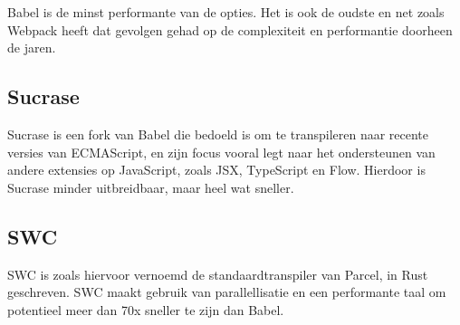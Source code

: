 Babel is de minst performante van de opties. Het is ook de oudste en net zoals Webpack heeft dat gevolgen gehad op de complexiteit en performantie doorheen de jaren. 

\subsection{Sucrase}

Sucrase is een fork van Babel die bedoeld is om te transpileren naar recente versies van ECMAScript, en zijn focus vooral legt naar het ondersteunen van andere extensies op JavaScript, zoals JSX, TypeScript en Flow. Hierdoor is Sucrase minder uitbreidbaar, maar heel wat sneller. \autocite{pierce}

\subsection{SWC}

SWC is zoals hiervoor vernoemd de standaardtranspiler van Parcel, in Rust geschreven. SWC maakt gebruik van parallellisatie en een performante taal om potentieel meer dan 70x sneller te zijn dan Babel. \autocite{swc}

